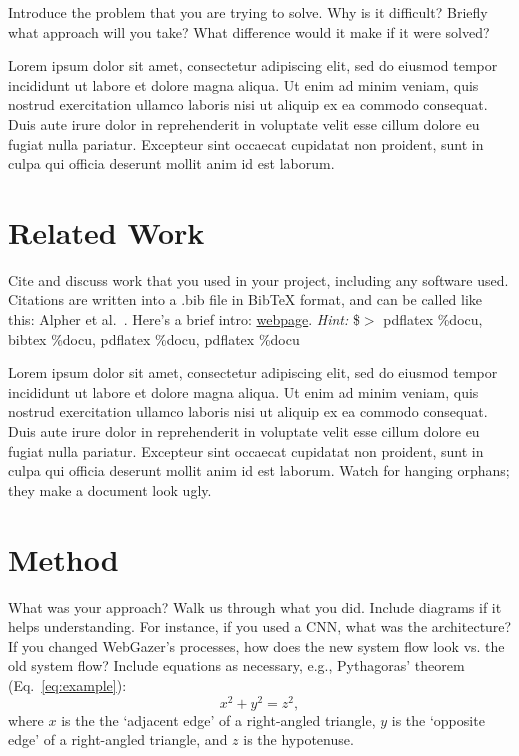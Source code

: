 \documentclass[10pt,twocolumn,letterpaper]{article}
\begin{document}
Introduce the problem that you are trying to solve. Why is it difficult? Briefly what approach will you take? What difference would it make if it were solved?

Lorem ipsum dolor sit amet, consectetur adipiscing elit, sed do eiusmod tempor incididunt ut labore et dolore magna aliqua. Ut enim ad minim veniam, quis nostrud exercitation ullamco laboris nisi ut aliquip ex ea commodo consequat. Duis aute irure dolor in reprehenderit in voluptate velit esse cillum dolore eu fugiat nulla pariatur. Excepteur sint occaecat cupidatat non proident, sunt in culpa qui officia deserunt mollit anim id est laborum.

\section{Related Work}

Cite and discuss work that you used in your project, including any software used. Citations are written into a .bib file in BibTeX format, and can be called like this: Alpher et al.~\cite{Alpher04}. Here's a brief intro: \href{http://www.andy-roberts.net/writing/latex/bibliographies}{webpage}. \emph{Hint:} \$$>$ pdflatex \%docu, bibtex \%docu, pdflatex \%docu, pdflatex \%docu

Lorem ipsum dolor sit amet, consectetur adipiscing elit, sed do eiusmod tempor incididunt ut labore et dolore magna aliqua. Ut enim ad minim veniam, quis nostrud exercitation ullamco laboris nisi ut aliquip ex ea commodo consequat. Duis aute irure dolor in reprehenderit in voluptate velit esse cillum dolore eu fugiat nulla pariatur. Excepteur sint occaecat cupidatat non proident, sunt in culpa qui officia deserunt mollit anim id est laborum. Watch for hanging orphans; they make a document look ugly.

\section{Method}

What was your approach? Walk us through what you did. Include diagrams if it helps understanding. For instance, if you used a CNN, what was the architecture? If you changed WebGazer's processes, how does the new system flow look vs. the old system flow? Include equations as necessary, e.g., Pythagoras' theorem (Eq.~\ref{eq:example}):
\begin{equation}
x^2 + y^2 = z^2,
\label{eq:example}
\end{equation}
where $x$ is the the `adjacent edge' of a right-angled triangle, $y$ is the `opposite edge' of a right-angled triangle, and $z$ is the hypotenuse.
\end{document}
